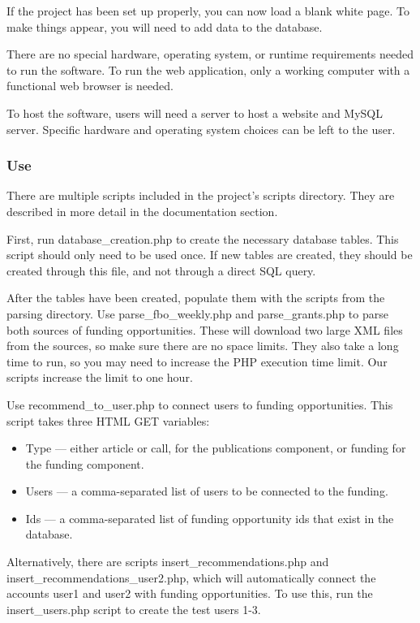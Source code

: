 \documentclass[onecolumn]{IEEEtran}
\begin{document}
If the project has been set up properly, you can now load a blank white page. To make things appear, you will need to add data to the database. 

There are no special hardware, operating system, or runtime requirements needed to run the software. To run the web application, only a working computer with a functional web browser is needed. 

To host the software, users will need a server to host a website and MySQL server. Specific hardware and operating system choices can be left to the user. 

\subsubsection{Use}
There are multiple scripts included in the project's scripts directory. They are described in more detail in the documentation section.  

First, run database\_creation.php to create the necessary database tables. This script should only need to be used once. If new tables are created, they should be created through this file, and not through a direct SQL query.  

After the tables have been created, populate them with the scripts from the parsing directory. Use parse\_fbo\_weekly.php and parse\_grants.php to parse both sources of funding opportunities. These will download two large XML files from the sources, so make sure there are no space limits. They also take a long time to run, so you may need to increase the PHP execution time limit. Our scripts increase the limit to one hour. 

Use recommend\_to\_user.php to connect users to funding opportunities. This script takes three HTML GET variables: 
\begin{itemize}
    \item Type --- either article or call, for the publications component, or funding for the funding      component. 
    \item Users --- a comma-separated list of users to be connected to the funding. 
    \item Ids --- a comma-separated list of funding opportunity ids that exist in the database. 
\end{itemize}

Alternatively, there are scripts insert\_recommendations.php and insert\_recommendations\_user2.php, which will automatically connect the accounts user1 and user2 with funding opportunities. To use this, run the insert\_users.php script to create the test users 1-3. 
\end{document}
